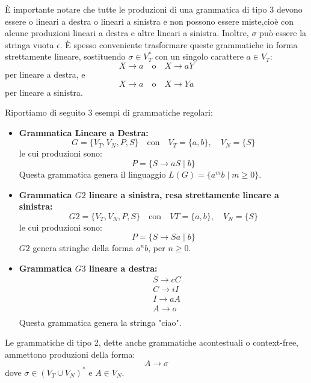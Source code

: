 \documentclass{article}
\begin{document}
È importante notare che tutte le produzioni di una grammatica di tipo 3 devono essere o lineari a destra o lineari a sinistra e non possono essere miste,cioè con alcune produzioni lineari a destra e altre lineari a sinistra. Inoltre, \( \sigma \) può essere la stringa vuota \( \epsilon \). È spesso conveniente trasformare queste grammatiche in forma strettamente lineare, sostituendo \( \sigma \in V_T^* \) con un singolo carattere \( a \in V_T \):
    \[
    X \rightarrow a \quad \text{o} \quad X \rightarrow aY
    \]
    per lineare a destra, e
    \[
    X \rightarrow a \quad \text{o} \quad X \rightarrow Ya
    \]
    per lineare a sinistra.
\begin{example}
Riportiamo di seguito 3 esempi di grammatiche regolari:

\begin{itemize}
    \item \textbf{Grammatica Lineare a Destra:}
   \[
    G = \{V_T, V_N,P, S\} \quad \text{con} \quad V_T = \{a, b\}, \quad V_N = \{S\}
\]
le cui produzioni sono:
\[
P = \{ S \rightarrow aS \mid b  \}
\]
\noindent
Questa grammatica genera il linguaggio \( L(G) = \{ a^m b \mid m \geq 0 \} \).

    \item \textbf{Grammatica  $G2$ lineare a sinistra, resa strettamente lineare a sinistra:}
  \[
    G2 = \{V_T, V_N,P , S\} \quad \text{con} \quad VT = \{a, b\}, \quad V_N = \{S\}
\]
le cui produzioni sono:
\[
P = \{ S \rightarrow Sa \mid b \}
\]
    $G2$ genera stringhe della forma \( a^n b \), per \( n \geq 0 \).

    \item \textbf{Grammatica $G3$ lineare a destra:}
    \[
    \begin{aligned}
        &S \rightarrow cC \\
        &C \rightarrow iI \\
        &I \rightarrow aA \\
        &A \rightarrow o \\
    \end{aligned}
    \]
    Questa grammatica genera la stringa "ciao".
\end{itemize}
\end{example} 
\noindent  
\begin{definition}
Le grammatiche di tipo 2, dette anche grammatiche acontestuali o context-free, ammettono produzioni della forma:
\[
A \rightarrow \sigma
\]
dove \( \sigma \in (V_T \cup V_N)^* \) e \( A \in V_N \).
\end{definition}
\end{document}
